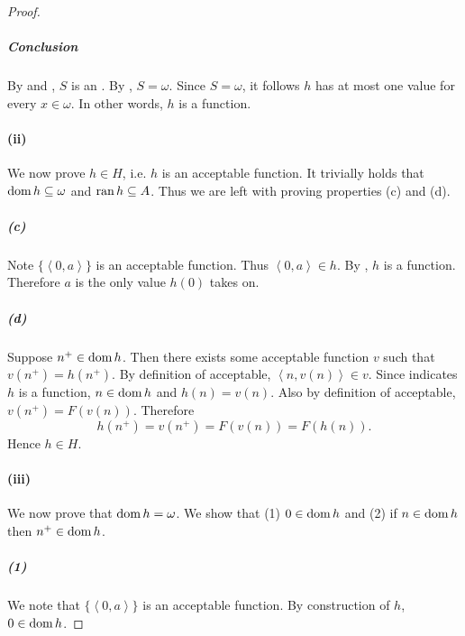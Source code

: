 \documentclass{report}
\newcommand{\pair}[1]{\left< #1 \right>}
\begin{document}
\begin{proof}
    \subparagraph{Conclusion}%

      By  and
        , $S$ is an
        .
      By , $S = \omega$.
      Since $S = \omega$, it follows $h$ has at most one value for every
        $x \in \omega$.
      In other words, $h$ is a function.

  \paragraph{(ii)}%

    We now prove $h \in H$, i.e. $h$ is an acceptable function.
    It trivially holds that $\mathop{\text{dom}}{h} \subseteq \omega$ and
      $\mathop{\text{ran}}{h} \subseteq A$.
    Thus we are left with proving properties (c) and (d).

    \subparagraph{(c)}%

      Note $\{\pair{0, a}\}$ is an acceptable function.
      Thus $\pair{0, a} \in h$.
      By , $h$ is a function.
      Therefore $a$ is the only value $h(0)$ takes on.

    \subparagraph{(d)}%

      Suppose $n^+ \in \mathop{\text{dom}}{h}$.
      Then there exists some acceptable function $v$ such that
        $v(n^+) = h(n^+)$.
      By definition of acceptable, $\pair{n, v(n)} \in v$.
      Since  indicates $h$ is a
        function, $n \in \mathop{\text{dom}}{h}$ and $h(n) = v(n)$.
      Also by definition of acceptable, $v(n^+) = F(v(n))$.
      Therefore $$h(n^+) = v(n^+) = F(v(n)) = F(h(n)).$$
      Hence $h \in H$.

  \paragraph{(iii)}%

    We now prove that $\mathop{\text{dom}}{h} = \omega$.
    We show that (1) $0 \in \mathop{\text{dom}}{h}$ and (2) if $n \in \mathop{\text{dom}}{h}$ then
      $n^+ \in \mathop{\text{dom}}{h}$.

    \subparagraph{(1)}%
    \label{spar:recursion-theorem-natural-numbers-iii-1}

      We note that $\{\pair{0, a}\}$ is an acceptable function.
      By construction of $h$, $0 \in \mathop{\text{dom}}{h}$.


\end{proof}
\end{document}
